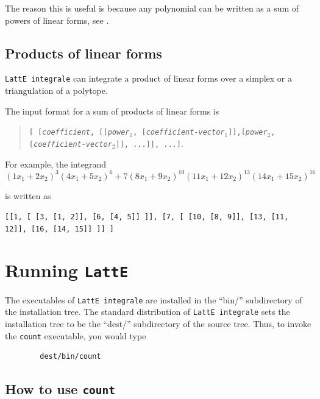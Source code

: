 \documentclass{article}
\newcommand{\latteInt}{{\tt LattE integrale}\xspace}
\begin{document}
The reason this is useful is because any polynomial can be written as a sum of powers of linear forms, see \cite{howToIntegratePolynomialSimplex}.


\subsection{Products of linear forms}

\latteInt can integrate a product of linear forms over a simplex or a triangulation of a polytope.

The input format for a sum of products of linear forms is
    \begin{quote}
      \texttt{[ [{\itshape coefficient}, [[{\itshape power$_1$}, [{\itshape coefficient-vector$_1$}]],[{\itshape power$_2$}, [{\itshape coefficient-vector$_2$}]], ...]],  ...]}.
    \end{quote}

For example, the integrand \[(1x_1 +2x_2)^3(4x_1 + 5x_2)^6 +7(8x_1 +9x_2)^{10}(11x_1 + 12x_2)^{13}(14x_1 +15x_2)^{16}\]

is written as

\texttt{[[1, [ [3, [1, 2]], [6, [4, 5]] ]], [7, [ [10, [8, 9]], [13, [11, 12]], [16, [14, 15]] ]] ]}



\section{Running {\tt LattE}}\label{Running LattE}

The executables of \latteInt are installed in the ``bin/'' subdirectory of the
installation tree.  The standard distribution of \latteInt sets the installation tree to be the
``dest/'' subdirectory of the source tree. 
Thus, to invoke the {\tt count} executable, you would type
\begin{verbatim}
        dest/bin/count
\end{verbatim}




\subsection{How to use {\tt count}}
\end{document}
